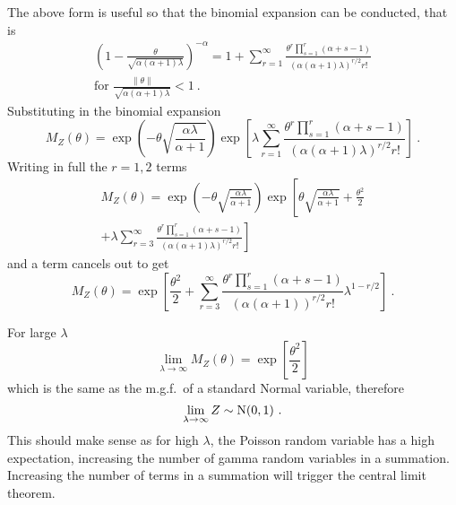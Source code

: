 The above form is useful so that the binomial expansion can be conducted, that is
\begin{multline}
	\left(
		1-\frac{\theta}{\sqrt{\alpha(\alpha+1)\lambda}}
	\right)^{-\alpha}
	=
	1+
	\sum_{r=1}^\infty \frac{\theta^r\prod_{s=1}^r(\alpha+s-1)}{(\alpha(\alpha+1)\lambda)^{r/2}r!}
	\\
	\text{for }\frac{\|\theta\|}{\sqrt{\alpha(\alpha+1)\lambda}}<1 \ .
\end{multline}
Substituting in the binomial expansion
\begin{equation}
	M_Z(\theta)=
	\exp\left(
	    -\theta\sqrt{\frac{\alpha\lambda}{\alpha+1}}
    \right)
	\exp\left[
		\lambda
		\sum_{r=1}^\infty \frac{\theta^r\prod_{s=1}^r(\alpha+s-1)}{(\alpha(\alpha+1)\lambda)^{r/2}r!}
	\right]
	\ .
\end{equation}
Writing in full the $r=1,2$ terms
\begin{multline}
	M_Z(\theta)=
	\exp\left(
	    -\theta\sqrt{\frac{\alpha\lambda}{\alpha+1}}
    \right)
	\exp\left[
		\theta\sqrt{\frac{\alpha\lambda}{\alpha+1}}
		+\frac{\theta^2}{2}
	\right.
	\\
	\left.
		+\lambda\sum_{r=3}^\infty \frac{\theta^r\prod_{s=1}^r(\alpha+s-1)}{(\alpha(\alpha+1)\lambda)^{r/2}r!}
	\right]
\end{multline}
and a term cancels out to get
\begin{equation}
	M_Z(\theta)=
	\exp\left[
		\frac{\theta^2}{2}
		+\sum_{r=3}^\infty
		\frac
			{\theta^r\prod_{s=1}^r(\alpha+s-1)}
			{(\alpha(\alpha+1))^{r/2}r!}
		\lambda^{1-r/2}
	\right]
	\ .
\end{equation}

For large $\lambda$
\begin{equation}
	\lim_{\lambda\rightarrow\infty}M_Z(\theta)=\exp\left[\frac{\theta^2}{2}\right]
\end{equation}
which is the same as the m.g.f.~of a standard Normal variable, therefore
\begin{equation}
	\lim_{\lambda\rightarrow\infty}Z\sim\operatorname{N}(0,1) \ .
\end{equation}
This should make sense as for high $\lambda$, the Poisson random variable has a high expectation, increasing the number of gamma random variables in a summation. Increasing the number of terms in a summation will trigger the central limit theorem.

